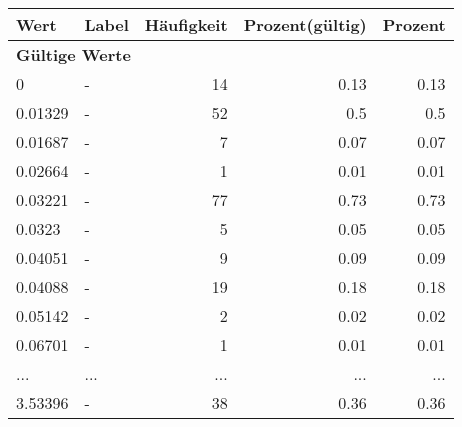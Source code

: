      \begin{longtable}{lXrrr}
     \toprule
     \textbf{Wert} & \textbf{Label} & \textbf{Häufigkeit} & \textbf{Prozent(gültig)} & \textbf{Prozent} \\
     \endhead
     \midrule
     \multicolumn{5}{l}{\textbf{Gültige Werte}}\\
        0 & \multicolumn{1}{X}{-} & %
          \num{14} &
          \num[round-mode=places,round-precision=2]{0.13} &
          \num[round-mode=places,round-precision=2]{0.13} \\
        0.01329 & \multicolumn{1}{X}{-} & %
          \num{52} &
          \num[round-mode=places,round-precision=2]{0.5} &
          \num[round-mode=places,round-precision=2]{0.5} \\
        0.01687 & \multicolumn{1}{X}{-} & %
          \num{7} &
          \num[round-mode=places,round-precision=2]{0.07} &
          \num[round-mode=places,round-precision=2]{0.07} \\
        0.02664 & \multicolumn{1}{X}{-} & %
          \num{1} &
          \num[round-mode=places,round-precision=2]{0.01} &
          \num[round-mode=places,round-precision=2]{0.01} \\
        0.03221 & \multicolumn{1}{X}{-} & %
          \num{77} &
          \num[round-mode=places,round-precision=2]{0.73} &
          \num[round-mode=places,round-precision=2]{0.73} \\
        0.0323 & \multicolumn{1}{X}{-} & %
          \num{5} &
          \num[round-mode=places,round-precision=2]{0.05} &
          \num[round-mode=places,round-precision=2]{0.05} \\
        0.04051 & \multicolumn{1}{X}{-} & %
          \num{9} &
          \num[round-mode=places,round-precision=2]{0.09} &
          \num[round-mode=places,round-precision=2]{0.09} \\
        0.04088 & \multicolumn{1}{X}{-} & %
          \num{19} &
          \num[round-mode=places,round-precision=2]{0.18} &
          \num[round-mode=places,round-precision=2]{0.18} \\
        0.05142 & \multicolumn{1}{X}{-} & %
          \num{2} &
          \num[round-mode=places,round-precision=2]{0.02} &
          \num[round-mode=places,round-precision=2]{0.02} \\
        0.06701 & \multicolumn{1}{X}{-} & %
          \num{1} &
          \num[round-mode=places,round-precision=2]{0.01} &
          \num[round-mode=places,round-precision=2]{0.01} \\
       ... & ... & ... & ... & ... \\
        3.53396 & \multicolumn{1}{X}{-} & %
          \num{38} &
          \num[round-mode=places,round-precision=2]{0.36} &
          \num[round-mode=places,round-precision=2]{0.36} \\


\end{longtable}
